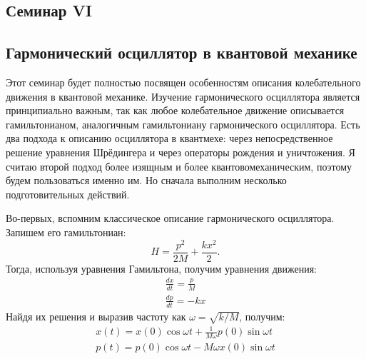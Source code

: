 \begin{center}
    \section{Семинар VI}
\end{center}
\subsection{Гармонический осциллятор в квантовой механике}
\hspace{1em} Этот семинар будет полностью посвящен особенностям описания колебательного движения в квантовой механике. Изучение гармонического осциллятора является принципиально важным, так как любое колебательное движение описывается гамильтонианом, аналогичным гамильтониану гармонического осциллятора. Есть два подхода к описанию осциллятора в квантмехе: через непосредственное решение уравнения Шрёдингера и через операторы рождения и уничтожения. Я считаю второй подход более изящным и более квантовомеханическим, поэтому будем пользоваться именно им. Но сначала выполним несколько подготовительных действий. 

Во-первых, вспомним классическое описание гармонического осциллятора. Запишем его гамильтониан:
\[
H = \frac{p^2}{2M} + \frac{kx^2}{2}.
\]
Тогда, используя уравнения Гамильтона, получим уравнения движения:
\begin{gather*}
    \frac{dx}{dt} = \frac{p}{M} \\
    \frac{dp}{dt} = -kx
\end{gather*}
Найдя их решения и выразив частоту как $\omega = \sqrt{k/M}$, получим:
\begin{gather*}
    x(t) = x(0)\cos\omega t + \frac{1}{M\omega}p(0)\sin\omega t \\
    p(t) = p(0)\cos \omega t - M\omega x(0) \sin\omega t
\end{gather*}

